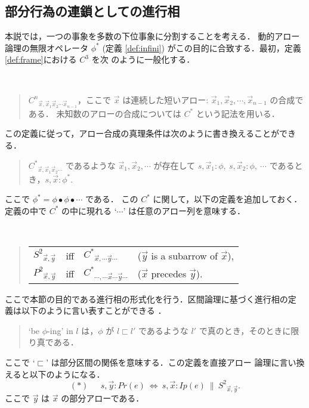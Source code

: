 \subsection{部分行為の連鎖としての進行相}\label{subsec:pr} 
本説では，一つの事象を多数の下位事象に分割することを考える．
動的アロー論理の無限オペレータ $\phi^{\ast} $ (定義 \ref{def:infini}) 
がこの目的に合致する．最初，定義 \ref{def:frame}における $C^{3}$ を次
のように一般化する．
\begin{my-def}[一般化アロー分割]~
\begin{quote}
${C^{n}}_{{\vec x},{\vec x_1}{\vec x_2}\cdots{\vec x_{n-1}}}$，ここで $\vec
x$ は連続した短いアロー: ${\vec x_1}, {\vec
x_2}, \cdots, {\vec x_{n-1}}$ の合成である．
未知数のアローの合成については ${C^{\ast}}$ という記法を用いる．
\end{quote}
\end{my-def}
この定義に従って，アロー合成の真理条件は次のように書き換えることができ
る．
\begin{quote}
${C^{\ast}}_{{\vec x}, {\vec x_1} {\vec
x_2}\cdots}$ であるような ${\vec x_1},{\vec
x_2},\cdots$ が存在して $s,{\vec x_1}\colon\phi,~s,{\vec x_2} \colon
\phi,~\cdots$ であるとき，$s,{\vec x}\colon \phi^{\ast}$.
\end{quote}
ここで $\phi^{\ast} = \phi \bullet \phi \bullet \cdots$ である．
この $C^{\ast}$ に関して，以下の定義を追加しておく．定義の中で 
$C^{\ast}$ の中に現れる `$\cdots$' は任意のアロー列を意味する．
\begin{my-def}[部分アローと前後関係]~
\begin{quote}
\begin{tabular}{llll}
${S^{2}}_{{\vec x},{\vec y}}$ &iff& ${C^{\ast}}_{{\vec
x},\cdots{\vec y}\cdots}$ & ($\vec y$ is a subarrow of $\vec x$),\\
${P^{2}}_{{\vec x},{\vec y}}$ &iff& ${C^{\ast}}_{\cdots,\cdots{\vec
x}\cdots{\vec y}\cdots}$ & ($\vec x$ precedes $\vec y$).
\end{tabular}
\end{quote}
\end{my-def}

ここで本節の目的である進行相の形式化を行う．区間論理に基づく進行相の定
義は以下のように言い表すことができる \cite{Partee84,Dowty79}．
\begin{quote}
`be $\phi$-ing' in $l$ は，$\phi$ が $l \sqsubset l'$ であるような
$l'$ で真のとき，そのときに限り真である．
\end{quote}
ここで `$\sqsubset$' は部分区間の関係を意味する．この定義を直接アロー
論理に言い換えると以下のようになる．
\[(\ast)~\quad~ s,{\vec y} \colon Pr(e) ~\Leftrightarrow~s,{\vec
x}\colon Ip(e)~\|~{S^{2}}_{{\vec x},{\vec y}}.\]
ここで $\vec y$ は $\vec x$ の部分アローである．

